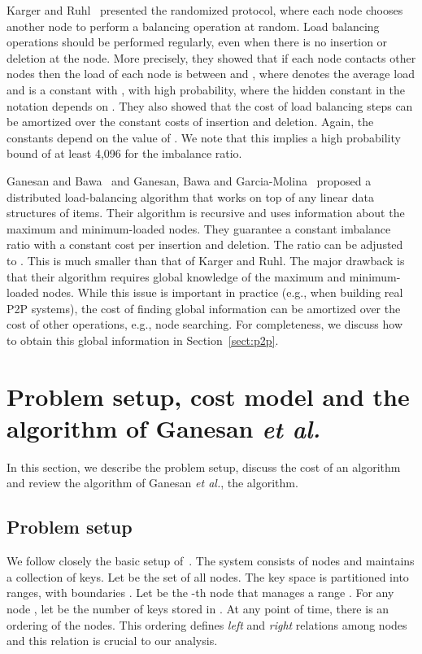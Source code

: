 \documentclass[a4paper]{article}
\begin{document}
Karger and Ruhl~\cite{Karger03newalgorithms, Karger04simpleefficient} 
presented the randomized protocol, where each node chooses another node 
to perform a balancing operation at random.  Load balancing operations
should be performed regularly, even when there is no insertion or deletion
at the node.  More precisely, they showed that if each node contacts  
other nodes then the load of each node is between  and 
, where  denotes the average load and  is a 
constant with , with high probability, where the hidden constant
in the  notation depends on .  They also showed that
the cost of load balancing steps can be amortized over the constant costs of 
insertion and deletion.  Again, the constants depend on the value of .
We note that this implies a high probability bound of at least 4,096 for the imbalance ratio.


Ganesan and Bawa~\cite{Ganesan03} and Ganesan, Bawa and
Garcia-Molina~\cite{GanesanBGM04-vldb} proposed a distributed
load-balancing algorithm that works on top of any linear data
structures of items. Their algorithm is recursive and uses 
information about the maximum and minimum-loaded nodes.  They guarantee a
constant imbalance ratio with a constant cost per insertion and
deletion.  The ratio can be adjusted to .  This is much smaller
than that of Karger and Ruhl.  The major drawback is that their
algorithm requires  global knowledge of the maximum and 
minimum-loaded nodes.  
While this issue is important in practice (e.g., when building 
real P2P systems), the cost of finding global information 
can be amortized over the cost of other operations, e.g., node searching.
For completeness, we discuss how to obtain this global information in
Section~\ref{sect:p2p}.

\section{Problem setup, cost model and the algorithm of Ganesan {\em
    et al.}}
\label{sect:model}

In this section, we describe the problem setup, discuss the cost of an
algorithm and review the algorithm of Ganesan {\em et al.}, the
{\adjload} algorithm.

\subsection{Problem setup}

We follow closely the basic setup of~\cite{GanesanBGM04-vldb}.  The
system consists of  nodes and maintains a collection of keys. Let
 be the set of all nodes. The key space is partitioned into 
ranges, with boundaries . Let  be
the -th node that manages a range . For any node , let  be the number of keys stored in . At any point of
time, there is an ordering of the nodes. This ordering defines {\em
  left} and {\em right} relations among nodes and this relation is
crucial to our analysis.
\end{document}

